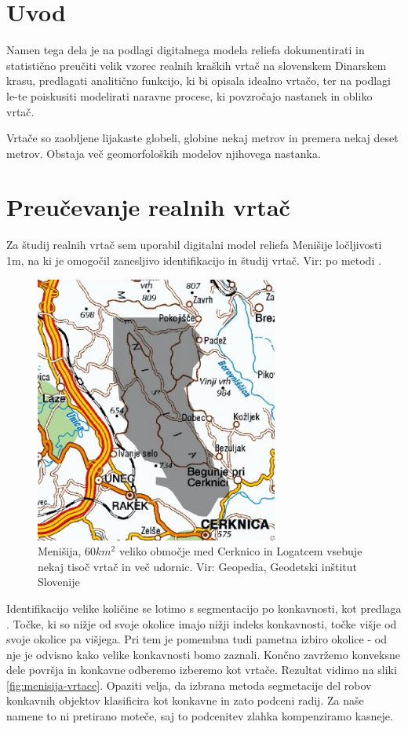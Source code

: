 \documentclass[a4paper, oneside, 12pt]{book}
\begin{document}
\mainmatter
\setcounter{page}{1}
\pagestyle{fancy}

\chapter{Uvod}
\label{ch1}
Namen tega dela je na podlagi digitalnega modela reliefa dokumentirati in statistično preučiti velik vzorec realnih kraških vrtač na slovenskem Dinarskem krasu, predlagati analitično funkcijo, ki bi opisala idealno vrtačo, ter na podlagi le-te poiskusiti modelirati naravne procese, ki povzročajo nastanek in obliko vrtač.

Vrtače so zaobljene lijakaste globeli, globine nekaj metrov in premera nekaj deset metrov. Obstaja več geomorfoloških modelov njihovega nastanka.

\chapter{Preučevanje realnih vrtač}

Za študij realnih vrtač sem uporabil digitalni model reliefa Menišije ločljivosti 1m, na ki je omogočil zanesljivo identifikacijo in študij vrtač. Vir: \cite{LAK} po metodi \cite{Kobler20079}.

\begin{figure}[H]
  \centering
  \includegraphics[width=8cm]{slike/menisija-karta}
  \caption{Menišija, $60 km^2$ veliko območje med Cerknico in Logatcem vsebuje nekaj tisoč vrtač in več udornic. Vir: Geopedia, Geodetski inštitut Slovenije}
  \label{fig:menisija-karta}
\end{figure}

Identifikacijo velike količine se lotimo s segmentacijo po konkavnosti, kot predlaga \cite{doctor13}. Točke, ki so nižje od svoje okolice imajo nižji indeks konkavnosti, točke višje od svoje okolice pa višjega. Pri tem je pomembna tudi pametna izbiro okolice - od nje je odvisno kako velike konkavnosti bomo zaznali. Končno zavržemo konveksne dele površja in konkavne odberemo izberemo kot vrtače. Rezultat vidimo na sliki \ref{fig:menisija-vrtace}. Opaziti velja, da izbrana metoda segmetacije del robov konkavnih objektov klasificira kot konkavne in zato podceni radij. Za naše namene to ni pretirano moteče, saj to podcenitev zlahka kompenziramo kasneje.
\end{document}
